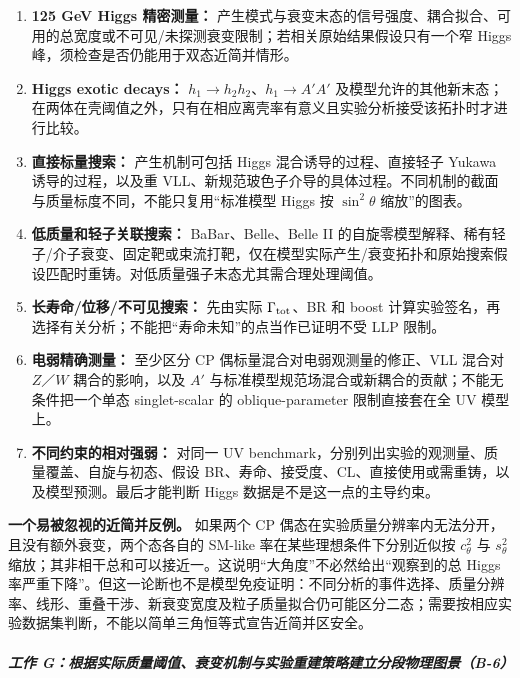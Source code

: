 \documentclass[
]{article}
\providecommand{\tightlist}{%
  \setlength{\itemsep}{0pt}\setlength{\parskip}{0pt}}
\begin{document}
\begin{enumerate}
\def\labelenumi{\arabic{enumi}.}
\tightlist
\item
  \textbf{125 GeV Higgs 精密测量：}
  产生模式与衰变末态的信号强度、耦合拟合、可用的总宽度或不可见/未探测衰变限制；若相关原始结果假设只有一个窄
  Higgs 峰，须检查是否仍能用于双态近简并情形。
\item
  \textbf{Higgs exotic decays：} \(h_1\to h_2h_2\)、\(h_1\to A'A'\)
  及模型允许的其他新末态；在两体在壳阈值之外，只有在相应离壳率有意义且实验分析接受该拓扑时才进行比较。
\item
  \textbf{直接标量搜索：} 产生机制可包括 Higgs 混合诱导的过程、直接轻子
  Yukawa 诱导的过程，以及重
  VLL、新规范玻色子介导的具体过程。不同机制的截面与质量标度不同，不能只复用``标准模型
  Higgs 按 \(\sin^2\theta\) 缩放''的图表。
\item
  \textbf{低质量和轻子关联搜索：} BaBar、Belle、Belle II
  的自旋零模型解释、稀有轻子/介子衰变、固定靶或束流打靶，仅在模型实际产生/衰变拓扑和原始搜索假设匹配时重铸。对低质量强子末态尤其需合理处理阈值。
\item
  \textbf{长寿命/位移/不可见搜索：} 先由实际 \(\Gamma_{\rm tot}\)、BR 和
  boost
  计算实验签名，再选择有关分析；不能把``寿命未知''的点当作已证明不受 LLP
  限制。
\item
  \textbf{电弱精确测量：} 至少区分 CP 偶标量混合对电弱观测量的修正、VLL
  混合对 \(Z\)／\(W\) 耦合的影响，以及 \(A'\)
  与标准模型规范场混合或新耦合的贡献；不能无条件把一个单态
  singlet-scalar 的 oblique-parameter 限制直接套在全 UV 模型上。
\item
  \textbf{不同约束的相对强弱：} 对同一 UV
  benchmark，分别列出实验的观测量、质量覆盖、自旋与初态、假设
  BR、寿命、接受度、CL、直接使用或需重铸，以及模型预测。最后才能判断
  Higgs 数据是不是这一点的主导约束。
\end{enumerate}

\textbf{一个易被忽视的近简并反例。} 如果两个 CP
偶态在实验质量分辨率内无法分开，且没有额外衰变，两个态各自的 SM-like
率在某些理想条件下分别近似按 \(c_\theta^2\) 与 \(s_\theta^2\)
缩放；其非相干总和可以接近一。这说明``大角度''不必然给出``观察到的总
Higgs
率严重下降''。但这一论断也不是模型免疫证明：不同分析的事件选择、质量分辨率、线形、重叠干涉、新衰变宽度及粒子质量拟合仍可能区分二态；需要按相应实验数据集判断，不能以简单三角恒等式宣告近简并区安全。

\subparagraph{工作
G：根据实际质量阈值、衰变机制与实验重建策略建立分段物理图景（B-6）}\label{ux5de5ux4f5c-gux6839ux636eux5b9eux9645ux8d28ux91cfux9608ux503cux8870ux53d8ux673aux5236ux4e0eux5b9eux9a8cux91cdux5efaux7b56ux7565ux5efaux7acbux5206ux6bb5ux7269ux7406ux56feux666fb-6}
\end{document}
